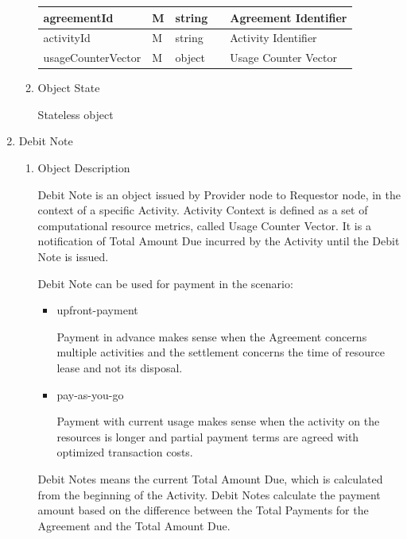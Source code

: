 \begin{enumerate}
\begin{enumerate}
\begin{table}[H]
\begin{center}
\begin{tabular}{|p{3cm}|l|p{3cm}|p{3cm}|p{4cm}|}
agreementId 		& M & string 				&  							&  Agreement Identifier \\
\hline	

activityId 			& M & string 				&  							&  Activity Identifier \\
\hline

usageCounterVector	& M & object				&							&  Usage Counter Vector \\
\hline

\end{tabular}
\end{center}
\end{table}

\item Object State

Stateless object

\end{enumerate}

\item Debit Note

\begin{enumerate}

\item Object Description

Debit Note is an object issued by Provider node to Requestor node, in the context of a specific Activity.
Activity Context is defined as a set of computational resource metrics, called Usage Counter Vector.
It is a notification of Total Amount Due incurred by the Activity until the Debit Note is issued.


Debit Note can be used for payment in the scenario:

\begin{itemize}

\item upfront-payment

Payment in advance makes sense when the Agreement concerns multiple activities and 
the settlement concerns the time of resource lease and not its disposal.

\item pay-as-you-go

Payment with current usage makes sense when the activity on the resources is longer and partial payment terms 
are agreed with optimized transaction costs.

\end{itemize}

Debit Notes means the current Total Amount Due, which is calculated from the beginning of the Activity.
Debit Notes calculate the payment amount based on the difference between the Total Payments 
for the Agreement and the Total Amount Due.


\end{enumerate}
\end{enumerate}
